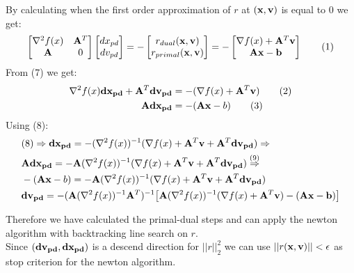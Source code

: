 \documentclass[12pt]{article}
\newcommand\numberthis{\addtocounter{equation}{1}\tag{\theequation}}
\begin{document}
\begin{enumerate}
		By calculating when the first order approximation of $r$ at $({\bf x},{\bf v})$ is equal to 0 we get:
		\begin{align*}
			\begin{bmatrix}
				\nabla^2f(x) & {\bf A}^T\\
				{\bf A} & 0
			\end{bmatrix}
			\begin{bmatrix}
				dx_{pd}\\
				dv_{pd}
			\end{bmatrix}=-
			\begin{bmatrix}
				r_{dual}({\bf x},{\bf v})\\
				 r_{primal}({\bf x},{\bf v})
			\end{bmatrix}=-
			\begin{bmatrix}
				\nabla f(x) + {\bf A}^T{\bf v}\\
				{\bf A}{\bf x}-{\bf b}
			\end{bmatrix}\numberthis
		\end{align*}
		From (7) we get:
		\begin{align*}
			\nabla^2f(x){\bf dx_{pd}}+{\bf A}^T{\bf dv_{pd}}&=-(\nabla f(x) + {\bf A}^T{\bf v})\numberthis\\
			{\bf A}{\bf dx_{pd}}&=-({\bf A}{\bf x}-b)\numberthis
		\end{align*}
		Using (8):
		\begin{align*}
			&(8)\Rightarrow {\bf dx_{pd}}=-(\nabla^2f(x))^{-1}(\nabla f(x) + {\bf A}^T{\bf v}+{\bf A}^T{\bf dv_{pd}}) \Rightarrow\\
			&{\bf A}{\bf dx_{pd}}=-{\bf A}(\nabla^2f(x))^{-1}(\nabla f(x) + {\bf A}^T{\bf v}+{\bf A}^T{\bf dv_{pd}}) \overset{(9)}{\Rightarrow}\\
			&-({\bf A}{\bf x}-b)=-{\bf A}(\nabla^2f(x))^{-1}(\nabla f(x) + {\bf A}^T{\bf v}+{\bf A}^T{\bf dv_{pd}})\\
			&{\bf dv_{pd}}=-({\bf A}(\nabla^2f(x))^{-1}{\bf A}^T)^{-1}\big[{\bf A}(\nabla^2f(x))^{-1}(\nabla f(x) + {\bf A}^T{\bf v})-({\bf A}{\bf x}-{\bf b})\big]
		\end{align*}
	
		Therefore we have calculated the primal-dual steps and can apply the newton algorithm with backtracking line search on $r$.\\
		Since $({\bf dv_{pd}},{\bf dx_{pd}})$ is a descend direction for $||r||_2^2$  we can use $||r({\bf x},{\bf v})||<\epsilon$ as stop criterion for the newton algorithm.
		

\end{enumerate}
\end{document}
